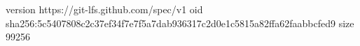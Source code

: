 version https://git-lfs.github.com/spec/v1
oid sha256:5c5407808c2c37ef34f7e7f5a7dab936317c2d0e1c5815a82ffa62faabbcfed9
size 99256
